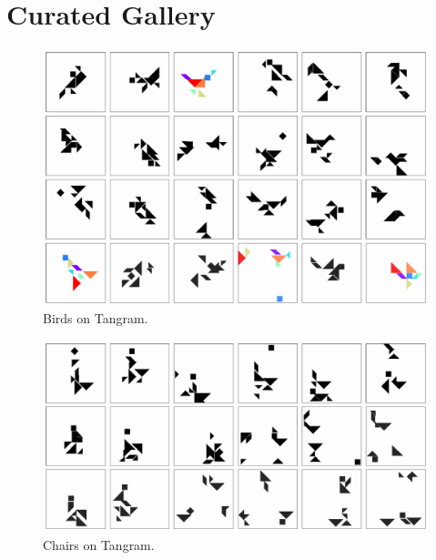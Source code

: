 


\chapter{Curated Gallery}
\label{sec:gallery}

\begin{figure}[h]
    \centering
    \includegraphics[width=\textwidth]{images/curation_bird.pdf}
    \caption{Birds on Tangram.}
    \label{fig:curation_bird}
\end{figure}

\begin{figure}[h]
    \centering
    \includegraphics[width=\textwidth]{images/curation_chair.pdf}
    \caption{Chairs on Tangram.}
    \label{fig:curation_chair}
\end{figure}

